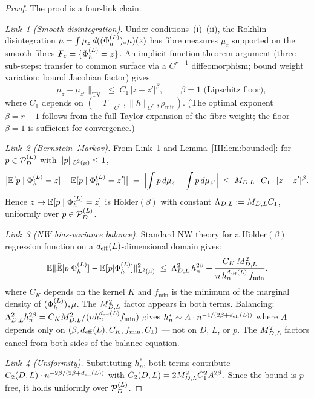 \ifdraft
\begin{proof}
The proof is a four-link chain.

\emph{Link~1 (Smooth disintegration).}
Under conditions~(i)--(ii), the Rokhlin disintegration
$\mu = \int \mu_z\,d((\Phi_h^{(L)})_*\mu)(z)$ has fibre measures $\mu_z$ supported on
the smooth fibres $F_z = \{\Phi_h^{(L)} = z\}$.
An implicit-function-theorem argument (three sub-steps: transfer to common
surface via a $C^{r-1}$ diffeomorphism; bound weight variation; bound
Jacobian factor) gives:
\[
  \|\mu_z - \mu_{z'}\|_{\mathrm{TV}} \;\leq\; C_1\,|z - z'|^\beta,
  \qquad \beta = 1 \text{ (Lipschitz floor)},
\]
where $C_1$ depends on $(\|T\|_{C^r}, \|h\|_{C^r}, \rho_{\min})$.
(The optimal exponent $\beta = r-1$ follows from the full Taylor expansion of
the fibre weight; the floor $\beta = 1$ is sufficient for convergence.)

\emph{Link~2 (Bernstein--Markov).}
From Link~1 and Lemma~\ref{III:lem:bounded}: for $p \in \mathcal{P}_D^{(L)}$ with
$\|p\|_{L^{2}(\mu)} \leq 1$,
\[
  \bigl|\mathbb{E}[p \mid \Phi_h^{(L)} = z] - \mathbb{E}[p \mid \Phi_h^{(L)} = z']\bigr|
  \;=\; \Bigl|\int p\,d\mu_z - \int p\,d\mu_{z'}\Bigr|
  \;\leq\; M_{D,L} \cdot C_1 \cdot |z - z'|^\beta.
\]
Hence $z \mapsto \mathbb{E}[p \mid \Phi_h^{(L)} = z]$ is $\mathrm{H\ddot{o}lder}(\beta)$
with constant $\Lambda_{D,L} := M_{D,L} C_1$, uniformly over $p \in \mathcal{P}_D^{(L)}$.

\emph{Link~3 (NW bias-variance balance).}
Standard NW theory \cite{Gyorfi2002} for a $\mathrm{H\ddot{o}lder}(\beta)$
regression function on a $d_{\mathrm{eff}}(L)$-dimensional domain gives:
\[
  \mathbb{E}\|\hat{\mathbb{E}}[p|\Phi_h^{(L)}] - \mathbb{E}[p|\Phi_h^{(L)}]\|_{L^{2}(\mu)}^2
  \;\leq\; \Lambda_{D,L}^2\,h_n^{2\beta}
    + \frac{C_K\,M_{D,L}^2}{n\,h_n^{d_{\mathrm{eff}}(L)}\,f_{\min}},
\]
where $C_K$ depends on the kernel $K$ and $f_{\min}$ is the minimum of the
marginal density of $(\Phi_h^{(L)})_*\mu$.
The $M_{D,L}^2$ factor appears in both terms.
Balancing: $\Lambda_{D,L}^2 h_n^{2\beta} = C_K M_{D,L}^2 / (n h_n^{d_{\mathrm{eff}}(L)} f_{\min})$
gives $h_n^* \sim A \cdot n^{-1/(2\beta+d_{\mathrm{eff}}(L))}$ where $A$ depends only
on $(\beta, d_{\mathrm{eff}}(L), C_K, f_{\min}, C_1)$ --- not on $D$, $L$, or $p$.
The $M_{D,L}^2$ factors cancel from both sides of the balance equation.

\emph{Link~4 (Uniformity).}
Substituting $h_n^*$, both terms contribute
$C_2(D,L) \cdot n^{-2\beta/(2\beta+d_{\mathrm{eff}}(L))}$ with
$C_2(D,L) = 2M_{D,L}^2 C_1^2 A^{2\beta}$.
Since the bound is $p$-free, it holds uniformly over $\mathcal{P}_D^{(L)}$.
\end{proof}
\else
